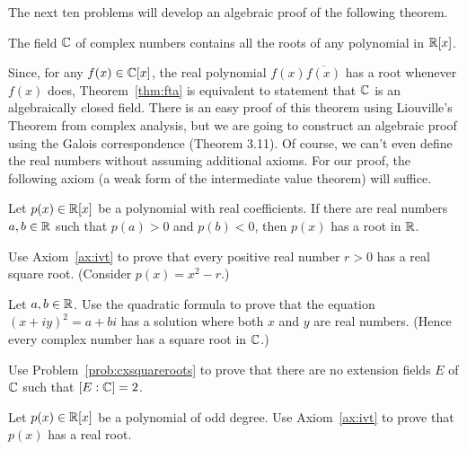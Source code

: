 The next ten problems will develop an algebraic proof of the following theorem.

\begin{theorem}\label{thm:fta}
    The field $\mathbb{C}$ of complex numbers contains all the roots of any polynomial in $\mathbb{R}[x]$.
\end{theorem}

Since, for any $f(x) \in \mathbb{C}[x]$, the real polynomial $f(x)\overline{f(x)}$ has a root whenever $f(x)$ does, Theorem~\ref{thm:fta} is equivalent to statement that $\mathbb{C}$ is an algebraically closed field. There is an easy proof of this theorem using Liouville's Theorem from complex analysis, but we are going to construct an algebraic proof using the Galois correspondence (Theorem 3.11). Of course, we can't even define the real numbers without assuming additional axioms. For our proof, the following axiom (a weak form of the intermediate value theorem) will suffice.

\begin{axiom}\label{ax:ivt}
    Let $p(x) \in \mathbb{R}[x]$ be a polynomial with real coefficients. If there are real numbers $a,b\in \mathbb{R}$ such that $p(a)>0$ and $p(b)<0$, then $p(x)$ has a root in $\mathbb{R}$.
\end{axiom}

\begin{problem}
    Use Axiom~\ref{ax:ivt} to prove that every positive real number $r>0$ has a real square root. (Consider $p(x) = x^2-r$.)
\end{problem}



\begin{problem}\label{prob:cxsquareroots}
    Let $a,b \in \mathbb{R}$. Use the quadratic formula to prove that the equation $(x+iy)^2 = a + bi$ has a solution where both $x$ and $y$ are real numbers. (Hence every complex number has a square root in $\mathbb{C}$.)
\end{problem}



\begin{problem}\label{prob:nodeg2}
Use Problem~\ref{prob:cxsquareroots} to prove that there are no extension fields $E$ of $\mathbb{C}$ such that $[E:\mathbb{C}] = 2$.
\end{problem}



\begin{problem}\label{prob:oddpoly}
    Let $p(x) \in \mathbb{R}[x]$ be a polynomial of odd degree. Use Axiom~\ref{ax:ivt} to prove that $p(x)$ has a real root.
\end{problem}



